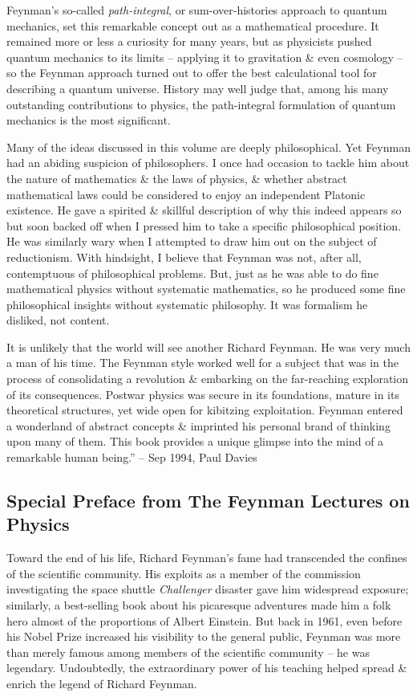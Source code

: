 \documentclass{article}
\begin{document}
{\sc Feynman}'s so-called {\it path-integral}, or sum-over-histories approach to quantum mechanics, set this remarkable concept out as a mathematical procedure. It remained more or less a curiosity for many years, but as physicists pushed quantum mechanics to its limits -- applying it to gravitation \& even cosmology -- so the {\sc Feynman} approach turned out to offer the best calculational tool for describing a quantum universe. History may well judge that, among his many outstanding contributions to physics, the path-integral formulation of quantum mechanics is the most significant.

Many of the ideas discussed in this volume are deeply philosophical. Yet {\sc Feynman} had an abiding suspicion of philosophers. I once had occasion to tackle him about the nature of mathematics \& the laws of physics, \& whether abstract mathematical laws could be considered to enjoy an independent Platonic existence. He gave a spirited \& skillful description of why this indeed appears so but soon backed off when I pressed him to take a specific philosophical position. He was similarly wary when I attempted to draw him out on the subject of reductionism. With hindsight, I believe that {\sc Feynman} was not, after all, contemptuous of philosophical problems. But, just as he was able to do fine mathematical physics without systematic mathematics, so he produced some fine philosophical insights without systematic philosophy. It was formalism he disliked, not content.

It is unlikely that the world will see another {\sc Richard Feynman}. He was very much a man of his time. The {\sc Feynman} style worked well for a subject that was in the process of consolidating a revolution \& embarking on the far-reaching exploration of its consequences. Postwar physics was secure in its foundations, mature in its theoretical structures, yet wide open for kibitzing exploitation. {\sc Feynman} entered a wonderland of abstract concepts \& imprinted his personal brand of thinking upon many of them. This book provides a unique glimpse into the mind of a remarkable human being.'' -- Sep 1994, {\sc Paul Davies}

\subsection*{Special Preface from The Feynman Lectures on Physics}
Toward the end of his life, {\sc Richard Feynman}'s fame had transcended the confines of the scientific community. His exploits as a member of the commission investigating the space shuttle {\it Challenger} disaster gave him widespread exposure; similarly, a best-selling book about his picaresque adventures made him a folk hero almost of the proportions of {\sc Albert Einstein}. But back in 1961, even before his Nobel Prize increased his visibility to the general public, {\sc Feynman} was more than merely famous among members of the scientific community -- he was legendary. Undoubtedly, the extraordinary power of his teaching helped spread \& enrich the legend of {\sc Richard Feynman}.
\end{document}
